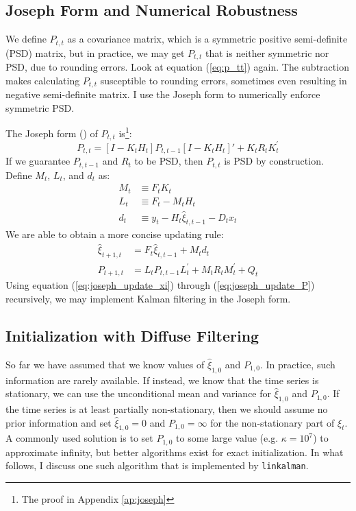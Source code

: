 \documentclass[12pt]{article}
\numberwithin{equation}{section}
\begin{document}
\subsection{Joseph Form and Numerical Robustness}
We define $P_{t,t}$ as a covariance matrix, which is a symmetric positive semi-definite (PSD) matrix, but in practice, we may get $P_{t,t}$ that is neither symmetric nor PSD, due to rounding errors. Look at equation (\ref{eq:p_tt}) again. The subtraction makes calculating $P_{t,t}$ susceptible to rounding errors, sometimes even resulting in negative semi-definite matrix. I use the Joseph form to numerically enforce symmetric PSD. 

The Joseph form (\cite{joseph_1968}) of $P_{t,t}$ is\footnote{The proof in Appendix \ref{ap:joseph}}:
\[
    P_{t,t} = [I - K_tH_t]P_{t,t-1}[I - K_tH_t]' + K_tR_tK_t^{'}    
\]
If we guarantee $P_{t,t-1}$ and $R_t$ to be PSD, then $P_{t,t}$ is PSD by construction. Define $M_t$, $L_t$, and $d_t$ as:
\begin{align*}
    M_t &\equiv F_tK_t \\
    L_t &\equiv F_t-M_tH_t \\
    d_t &\equiv y_t - H_t\hat{\xi}_{t,t-1} - D_tx_t
\end{align*}
We are able to obtain a more concise updating rule:
\begin{align}
    \hat{\xi}_{t+1,t} &= F_t\hat{\xi}_{t,t-1} + M_td_t \label{eq:joseph_update_xi} \\
    P_{t+1,t} &= L_tP_{t,t-1}L_t^{'} + M_tR_tM_t^{'} + Q_t \label{eq:joseph_update_P}
\end{align}
Using equation (\ref{eq:joseph_update_xi}) through (\ref{eq:joseph_update_P}) recursively, we may implement Kalman filtering in the Joseph form. 

\subsection{Initialization with Diffuse Filtering} \label{subsec:diff_filter}
So far we have assumed that we know values of $\hat{\xi}_{1,0}$ and $P_{1,0}$. In practice, such information are rarely available. If instead, we know that the time series is stationary, we can use the unconditional mean and variance for $\hat{\xi}_{1,0}$ and $P_{1,0}$. If the time series is at least partially non-stationary, then we should assume no prior information and set $\hat{\xi}_{1,0}=0$ and $P_{1,0}=\infty$ for the non-stationary part of $\xi_t$. A commonly used solution is to set $P_{1,0}$ to some large value (e.g. $\kappa=10^7$) to approximate infinity, but better algorithms exist for exact initialization. In what follows, I discuss one such algorithm that is implemented by \texttt{linkalman}.
\end{document}
